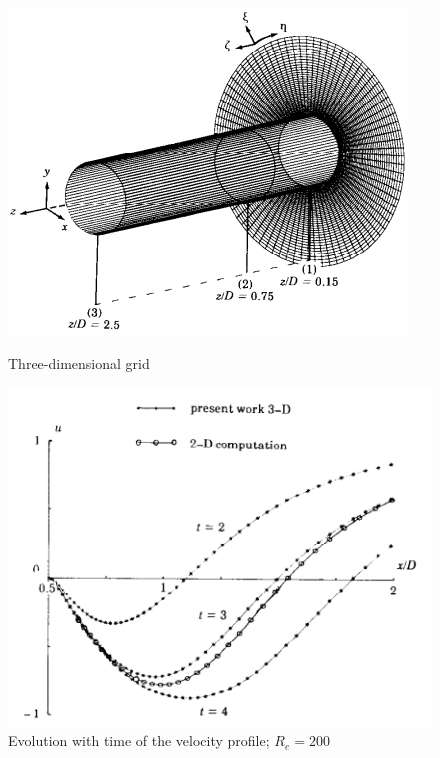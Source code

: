 \documentclass[11pt]{report}
\begin{document}
	\begin{figure}[!h]
		\centering
		\begin{minipage}{.4\textwidth}
			\centering
			\includegraphics[width=1\linewidth]{graph_1}
			\caption{Three-dimensional grid}
			\label{fig:4_1}
		\end{minipage}
		\begin{minipage}{.3\textwidth}
			\centering
			\includegraphics[width=1.3\linewidth]{graph_2}
			\caption{Evolution with time of the velocity profile; $R_e=200$}
			\label{fig:4_2}
		\end{minipage}
	\end{figure}
\end{document}
